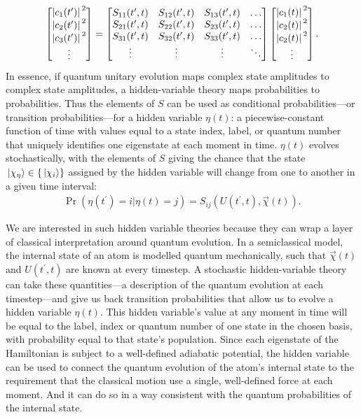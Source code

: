 \begin{align}
\left[\begin{matrix}
\abs{c_1(t^\prime)}^2\\\abs{c_2(t^\prime)}^2\\\abs{c_3(t^\prime)}^2\\\vdots
\end{matrix}\right]
= \left[\begin{matrix}
S_{11}(t^\prime, t) & S_{12}(t^\prime, t) & S_{13}(t^\prime, t)&\hdots\\
S_{21}(t^\prime, t) & S_{22}(t^\prime, t) & S_{23}(t^\prime, t)&\hdots\\
S_{31}(t^\prime, t) & S_{32}(t^\prime, t) & S_{33}(t^\prime, t)&\hdots\\
\vdots & \vdots & \vdots & \ddots
\end{matrix}\right]
\left[\begin{matrix}
\abs{c_1(t)}^2\\\abs{c_2(t)}^2\\\abs{c_2(t)}^2\\\vdots
\end{matrix}\right].
\end{align}
In essence, if quantum unitary evolution maps complex state amplitudes to complex state amplitudes, a hidden-variable theory maps probabilities to probabilities. Thus the elements of $S$ can be used as conditional probabilities---or transition probabilities---for a hidden variable $\eta(t)$: a piecewise-constant function of time with values equal to a state index, label, or quantum number that uniquely identifies one eigenstate at each moment in time. $\eta(t)$ evolves stochastically, with the elements of $S$ giving the chance that the state $\ket{\chi_\eta} \in \{\ket{\chi_i}\}$ assigned by the hidden variable will change from one to another in a given time interval:
\begin{align}\label{eq:conditional_probability}
\Pr(\eta(t^\prime){=}i|\eta(t){=}j) = S_{ij}(U(t^\prime, t), \vec\chi(t)).
\end{align}

We are interested in such hidden variable theories because they can wrap a layer of classical interpretation around quantum evolution. In a semiclassical model, the internal state of an atom is modelled quantum mechanically, such that $\vec\chi(t)$ and $U(t^\prime, t)$ are known at every timestep. A stochastic hidden-variable theory can take these quantities---a description of the quantum evolution at each timestep---and give us back transition probabilities that allow us to evolve a hidden variable $\eta(t)$. This hidden variable's value at any moment in time will be equal to the label, index or quantum number of one state in the chosen basis, with probability equal to that state's population. Since each eigenstate of the Hamiltonian is subject to a well-defined adiabatic potential, the hidden variable can be used to connect the quantum evolution of the atom's internal state to the requirement that the classical motion use a single, well-defined force at each moment. And it can do so in a way consistent with the quantum probabilities of the internal state.

